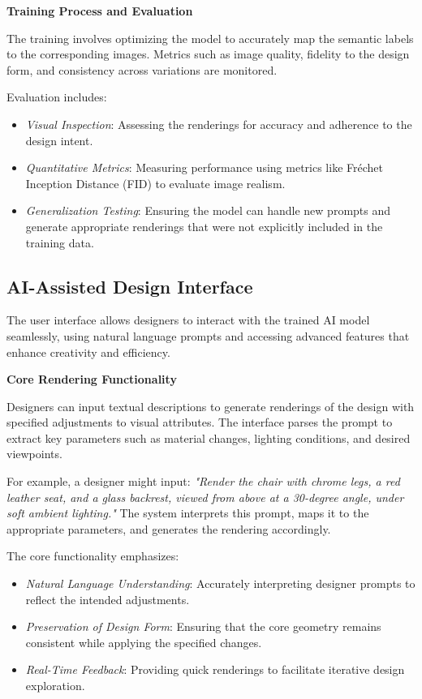 \documentclass{article}
\begin{document}
\textbf{Training Process and Evaluation}

The training involves optimizing the model to accurately map the semantic labels to the corresponding images. Metrics such as image quality, fidelity to the design form, and consistency across variations are monitored.

Evaluation includes:

\begin{itemize}
    \item \textit{Visual Inspection}: Assessing the renderings for accuracy and adherence to the design intent.
    \item \textit{Quantitative Metrics}: Measuring performance using metrics like Fréchet Inception Distance (FID) to evaluate image realism.
    \item \textit{Generalization Testing}: Ensuring the model can handle new prompts and generate appropriate renderings that were not explicitly included in the training data.
\end{itemize}

\subsection{AI-Assisted Design Interface}

The user interface allows designers to interact with the trained AI model seamlessly, using natural language prompts and accessing advanced features that enhance creativity and efficiency.

\textbf{Core Rendering Functionality}

Designers can input textual descriptions to generate renderings of the design with specified adjustments to visual attributes. The interface parses the prompt to extract key parameters such as material changes, lighting conditions, and desired viewpoints.

For example, a designer might input: \textit{"Render the chair with chrome legs, a red leather seat, and a glass backrest, viewed from above at a 30-degree angle, under soft ambient lighting."} The system interprets this prompt, maps it to the appropriate parameters, and generates the rendering accordingly.

The core functionality emphasizes:

\begin{itemize}
    \item \textit{Natural Language Understanding}: Accurately interpreting designer prompts to reflect the intended adjustments.
    \item \textit{Preservation of Design Form}: Ensuring that the core geometry remains consistent while applying the specified changes.
    \item \textit{Real-Time Feedback}: Providing quick renderings to facilitate iterative design exploration.
\end{itemize}
\end{document}
